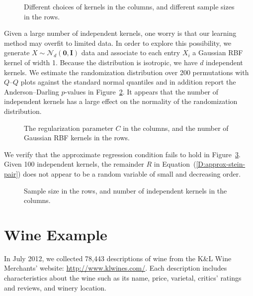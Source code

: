 \begin{figure}
  \begin{center}
    \resizebox{14.0cm}{!}{
      
    }
  \end{center}
\caption{Different choices of kernels in the columns, and different
  sample sizes in the rows.}
\label{fig:mkl_arc}
\end{figure}

Given a large number of independent kernels, one worry is that our
learning method may overfit to limited data.  In order to explore this
possibility, we generate $X \sim \mathcal{N}_d({\mathbf 0}, {\mathbf I})$
data and associate to each entry $X_i$ a Gaussian RBF kernel of width
1.  Because the distribution is isotropic, we have $d$ independent
kernels.  We estimate the randomization distribution over 200
permutations with $Q$--$Q$ plots against the standard normal quantiles
and in addition report the Anderson--Darling $p$-values
in Figure~\ref{fig:overfit_mkl}.  It appears that the number of
independent kernels has a large effect on the normality of the
randomization distribution.

\begin{figure}
  \begin{center}
    \resizebox{14.0cm}{!}{
      
    }
  \end{center}
\caption{The regularization parameter $C$ in the columns, and the
  number of Gaussian RBF kernels in the rows.}
\label{fig:overfit_mkl}
\end{figure}

We verify that the approximate regression condition fails to hold in
Figure~\ref{fig:mkl_arc_overfit}.  Given 100 independent kernels, the
remainder $R$ in Equation~(\ref{D:approx-stein-pair}) does not
appear to be a random variable of small and decreasing order.

\begin{figure}
  \begin{center}
    \resizebox{14.0cm}{!}{
      
    }
  \end{center}
\caption{Sample size in the rows, and number of independent kernels in
the columns.}
\label{fig:mkl_arc_overfit}
\end{figure}

\section{Wine Example}
In July 2012, we collected 78,443 descriptions of wine from the K\&L
Wine Merchants' website: \url{http://www.klwines.com/}.  Each
description includes characteristics about the wine such as its name,
price, varietal, critics' ratings and reviews, and winery location.

